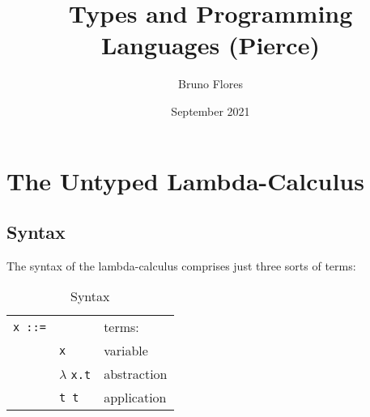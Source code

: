 \documentclass{article}
\title{Types and Programming Languages (Pierce)}
\author{Bruno Flores}
\date{September 2021}
\begin{document}
\maketitle

\section{The Untyped Lambda-Calculus}

\subsection{Syntax}

The syntax of the lambda-calculus comprises just three sorts of terms:

\begin{table}[h!]
    \begin{tabularx}{1\textwidth} 
      { >{\raggedright\arraybackslash}l
        >{\raggedright\arraybackslash}l
        >{\raggedleft\arraybackslash}X }
    
         \texttt{x ::=} & & terms: \\
         & \texttt{x} & variable \\
         & \(\lambda\) \texttt{x.t} & abstraction \\
         & \texttt{t t} & application \\
    \end{tabularx}
    \caption{Syntax}
\end{table}
\end{document}
